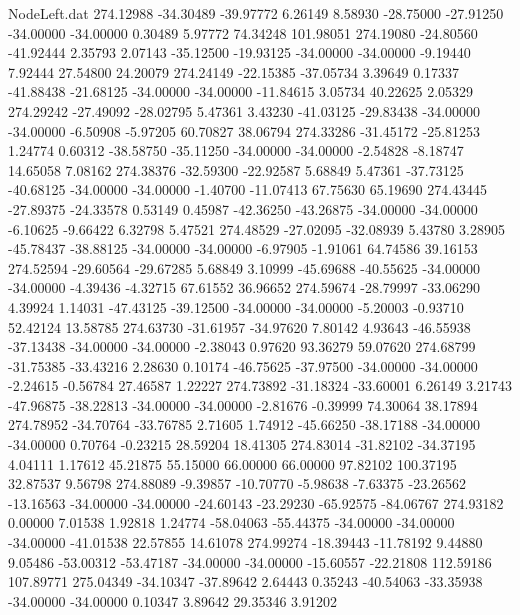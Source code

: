 \begin{filecontents}{NodeLeft.dat}
 274.12988  -34.30489  -39.97772     6.26149    8.58930  -28.75000  -27.91250  -34.00000  -34.00000    0.30489    5.97772   74.34248  101.98051
 274.19080  -24.80560  -41.92444     2.35793    2.07143  -35.12500  -19.93125  -34.00000  -34.00000   -9.19440    7.92444   27.54800   24.20079
 274.24149  -22.15385  -37.05734     3.39649    0.17337  -41.88438  -21.68125  -34.00000  -34.00000  -11.84615    3.05734   40.22625    2.05329
 274.29242  -27.49092  -28.02795     5.47361    3.43230  -41.03125  -29.83438  -34.00000  -34.00000   -6.50908   -5.97205   60.70827   38.06794
 274.33286  -31.45172  -25.81253     1.24774    0.60312  -38.58750  -35.11250  -34.00000  -34.00000   -2.54828   -8.18747   14.65058    7.08162
 274.38376  -32.59300  -22.92587     5.68849    5.47361  -37.73125  -40.68125  -34.00000  -34.00000   -1.40700  -11.07413   67.75630   65.19690
 274.43445  -27.89375  -24.33578     0.53149    0.45987  -42.36250  -43.26875  -34.00000  -34.00000   -6.10625   -9.66422    6.32798    5.47521
 274.48529  -27.02095  -32.08939     5.43780    3.28905  -45.78437  -38.88125  -34.00000  -34.00000   -6.97905   -1.91061   64.74586   39.16153
 274.52594  -29.60564  -29.67285     5.68849    3.10999  -45.69688  -40.55625  -34.00000  -34.00000   -4.39436   -4.32715   67.61552   36.96652
 274.59674  -28.79997  -33.06290     4.39924    1.14031  -47.43125  -39.12500  -34.00000  -34.00000   -5.20003   -0.93710   52.42124   13.58785
 274.63730  -31.61957  -34.97620     7.80142    4.93643  -46.55938  -37.13438  -34.00000  -34.00000   -2.38043    0.97620   93.36279   59.07620
 274.68799  -31.75385  -33.43216     2.28630    0.10174  -46.75625  -37.97500  -34.00000  -34.00000   -2.24615   -0.56784   27.46587    1.22227
 274.73892  -31.18324  -33.60001     6.26149    3.21743  -47.96875  -38.22813  -34.00000  -34.00000   -2.81676   -0.39999   74.30064   38.17894
 274.78952  -34.70764  -33.76785     2.71605    1.74912  -45.66250  -38.17188  -34.00000  -34.00000    0.70764   -0.23215   28.59204   18.41305
 274.83014  -31.82102  -34.37195     4.04111    1.17612   45.21875   55.15000   66.00000   66.00000   97.82102  100.37195   32.87537    9.56798
 274.88089   -9.39857  -10.70770    -5.98638   -7.63375  -23.26562  -13.16563  -34.00000  -34.00000  -24.60143  -23.29230  -65.92575  -84.06767
 274.93182    0.00000    7.01538     1.92818    1.24774  -58.04063  -55.44375  -34.00000  -34.00000  -34.00000  -41.01538   22.57855   14.61078
 274.99274  -18.39443  -11.78192     9.44880    9.05486  -53.00312  -53.47187  -34.00000  -34.00000  -15.60557  -22.21808  112.59186  107.89771
 275.04349  -34.10347  -37.89642     2.64443    0.35243  -40.54063  -33.35938  -34.00000  -34.00000    0.10347    3.89642   29.35346    3.91202

\end{filecontents}
